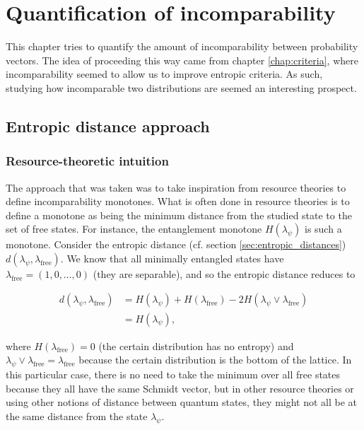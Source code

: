 \chapter{Quantification of incomparability} \label{chap:incomparability}

This chapter tries to quantify the amount of incomparability between probability vectors. The idea of proceeding this way came from chapter \ref{chap:criteria}, where incomparability seemed to allow us to improve entropic criteria. As such, studying how incomparable two distributions are seemed an interesting prospect.

\section{Entropic distance approach}

\subsection{Resource-theoretic intuition}

The approach that was taken was to take inspiration from resource theories to define incomparability monotones. What is often done in resource theories is to define a monotone as being the minimum distance from the studied state to the set of free states. For instance, the entanglement monotone $H(\lambda_\psi)$ is such a monotone. Consider the entropic distance (cf. section \ref{sec:entropic_distances}) $d(\lambda_\psi, \lambda_{\text{free}})$. We know that all minimally entangled states have $\lambda_\text{free} = (1, 0, \dots, 0)$ (they are separable), and so the entropic distance reduces to

\begin{align}
    d(\lambda_\psi, \lambda_\text{free}) &= H(\lambda_\psi) + H(\lambda_\text{free}) - 2 H(\lambda_\psi \vee \lambda_\text{free})\\
                                      &= H(\lambda_\psi),
\end{align}

\noindent where $H(\lambda_\text{free}) = 0$ (the certain distribution has no entropy) and $\lambda_\psi \vee \lambda_\text{free} = \lambda_\text{free}$ because the certain distribution is the bottom of the lattice. In this particular case, there is no need to take the minimum over all free states because they all have the same Schmidt vector, but in other resource theories or using other notions of distance between quantum states, they might not all be at the same distance from the state $\lambda_\psi$.

